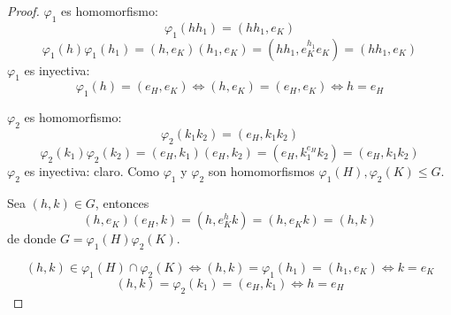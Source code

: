 
\begin{proof}
	$\varphi_1$ es homomorfismo:
	\begin{equation*}
		\varphi_1(h h_1) = (h h_1, e_K)
	\end{equation*}
	\begin{equation*}
		\varphi_1(h) \varphi_1(h_1) = (h, e_K)(h_1, e_K) = (h h_1, e_K^{h_1} e_K) = (h h_1, e_K)
	\end{equation*}
	$\varphi_1$ es inyectiva:
	\begin{equation*}
		\varphi_1(h) = (e_H, e_K) \iff (h, e_K) = (e_H, e_K) \iff h = e_H
	\end{equation*}


	$\varphi_2$ es homomorfismo:
	\begin{equation*}
		\varphi_2(k_1 k_2) = (e_H, k_1 k_2)
	\end{equation*}
	\begin{equation*}
		\varphi_2(k_1) \varphi_2(k_2) = (e_H, k_1)(e_H, k_2) = (e_H, k_1^{e_H} k_2) = (e_H, k_1 k_2)
	\end{equation*}
	$\varphi_2$ es inyectiva: claro. Como $\varphi_1$ y $\varphi_2$ son homomorfismos $\varphi_1(H), \varphi_2(K) \le G$.

	Sea $(h, k) \in G$, entonces
	\begin{equation*}
		(h, e_K)(e_H, k) = (h, e_K^h k) = (h, e_K k) = (h, k)
	\end{equation*}
	de donde $G = \varphi_1(H) \varphi_2(K)$.

	\begin{equation*}
		(h, k) \in \varphi_1(H) \cap \varphi_2(K) \iff (h, k) = \varphi_1(h_1) = (h_1, e_K) \iff k=e_K
	\end{equation*}
	\begin{equation*}
		(h, k) = \varphi_2(k_1) = (e_H, k_1) \iff h=e_H
	\end{equation*}

\end{proof}
